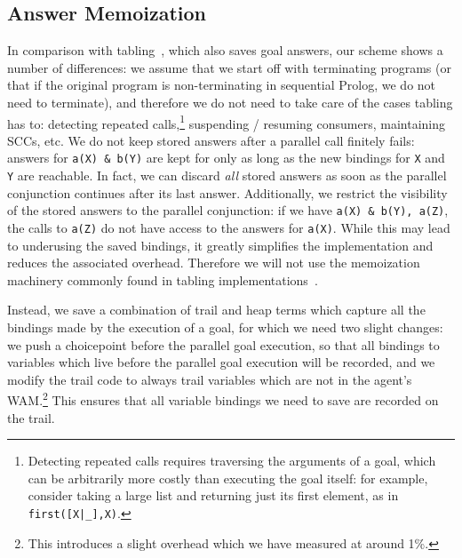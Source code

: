 \documentclass{tlp}
\newcommand{\compressection}{\vspace{-1em}}
\begin{document}
\compressection
\subsection{Answer Memoization}
\label{sec:-answers-memoization}

In comparison with
tabling~\cite{tamaki.iclp86-short,Warren92,chen96:tabled_evaluation},
which also saves goal answers, our scheme shows a number of
differences:
we assume that we start off with terminating programs (or that if the
original program is non-terminating in sequential Prolog, we do not
need to terminate), and therefore we do not need to take care of the
cases tabling has to: detecting repeated calls,\footnote{Detecting
  repeated calls requires traversing the arguments of a goal, which
  can be arbitrarily more costly than executing the goal itself: for
  example, consider taking a large list and returning just its first
  element, as in
{\scriptsize\lstinline{first([X|_],X)}}.}  suspending / resuming consumers,
maintaining SCCs, etc.
We do not keep stored answers after a parallel call finitely fails:
answers for 
\lstinline{a(X) & b(Y)} are kept for only as long as the new bindings
for \lstinline{X} and \lstinline{Y} are reachable. In fact,
we can discard \emph{all} stored answers as soon as the parallel
conjunction continues after its last answer.  Additionally, we
restrict the visibility of the stored answers to the parallel
conjunction: if we have
\lstinline{a(X) & b(Y), a(Z)},
the calls to \lstinline{a(Z)} do not have access to the answers for
 \lstinline{a(X)}.  While this may lead to underusing the saved
 bindings, it greatly simplifies the implementation and reduces the
 associated overhead.
Therefore we will not use the memoization machinery commonly found in
 tabling implementations~\cite{rama95:efficient_tabling}.


 Instead, we save a combination of trail and heap terms which capture
 all the bindings made by the execution of a goal, for which we need
 two slight changes: we push a choicepoint before the parallel goal
 execution, so that all bindings to variables which live before the
 parallel goal execution will be recorded, and we modify the trail
 code to always trail variables which are not in the agent's
 WAM.\footnote{This introduces a slight overhead which we have
   measured at around 1\%.}  This ensures that all variable bindings
 we need to save are recorded on the trail.
\end{document}
